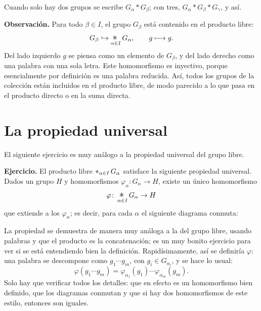 \documentclass[11pt]{article}
\begin{document}
Cuando solo hay dos grupos se escribe $G_\alpha*G_\beta$; con tres, $G_\alpha*G_\beta*G_\gamma$, y así.

\medskip\noindent\textbf{Observación.} Para todo $\beta\in I$, el grupo $G_\beta$ está contenido en el producto libre:
\[
  G_\beta\hookrightarrow\mathop{\scalebox{1.4}{$*$}}_{\alpha\in I}G_\alpha,\qquad g\longmapsto g.
\]
Del lado izquierdo $g$ se piensa como un elemento de $G_\beta$, y del lado derecho como una palabra con una sola letra. Este homomorfismo es inyectivo, porque esencialmente por definición es una palabra reducida. Así, todos los grupos de la colección están incluidos en el producto libre, de modo parecido a lo que pasa en el producto directo o en la suma directa.

\section*{La propiedad universal}

El siguiente ejercicio es muy análogo a la propiedad universal del grupo libre.

\medskip\noindent\textbf{Ejercicio.} El producto libre $\mathop{\scalebox{1.1}{$*$}}_{\alpha\in I}G_\alpha$ satisface la siguiente propiedad universal. Dados un grupo $H$ y homomorfismos $\varphi_\alpha\colon G_\alpha\to H$, existe un único homomorfismo
\[
  \varphi\colon\mathop{\scalebox{1.4}{$*$}}_{\alpha\in I}G_\alpha\to H
\]
que extiende a los $\varphi_\alpha$; es decir, para cada $\alpha$ el siguiente diagrama conmuta:
\begin{center}
\end{center}

La propiedad se demuestra de manera muy análoga a la del grupo libre, usando palabras y que el producto es la concatenación; es un muy bonito ejercicio para ver si se está entendiendo bien la definición. Rapidísimamente, así se definiría $\varphi$: una palabra se descompone como $g_1\cdots g_m$, con $g_i\in G_{\alpha_i}$, y se hace lo usual:
\[
  \varphi(g_1\cdots g_m)=\varphi_{\alpha_1}(g_1)\cdots\varphi_{\alpha_m}(g_m).
\]
Solo hay que verificar todos los detalles: que en efecto es un homomorfismo bien definido, que los diagramas conmutan y que si hay dos homomorfismos de este estilo, entonces son iguales.
\end{document}
